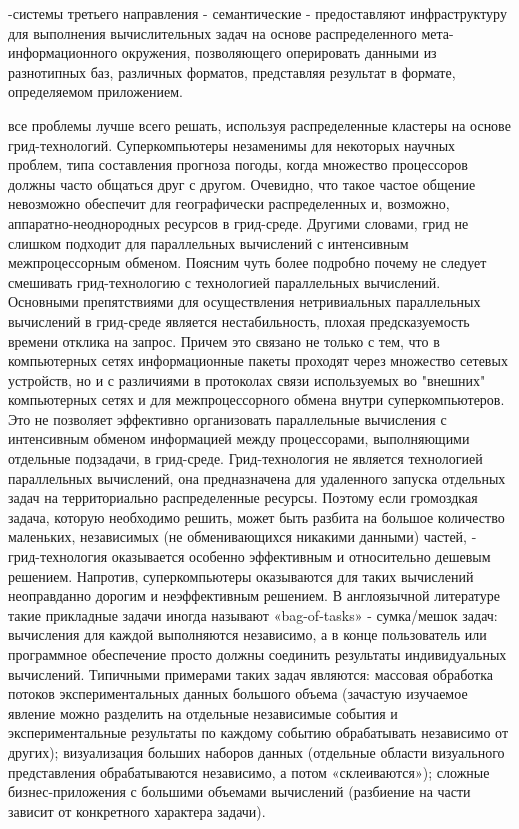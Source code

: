 \documentclass[och, referat]{SCWorks}
\begin{document}
-системы третьего направления - семантические - предоставляют инфраструктуру для выполнения вычислительных задач на основе распределенного мета-информационного окружения, позволяющего оперировать данными из разнотипных баз, различных форматов, представляя результат в формате, определяемом приложением. 
\newline

 все проблемы лучше всего решать, используя распределенные кластеры на основе грид-технологий. Суперкомпьютеры незаменимы для некоторых научных проблем, типа составления прогноза погоды, когда множество процессоров должны часто общаться друг с другом. Очевидно, что такое частое общение невозможно обеспечит для географически распределенных и, возможно, аппаратно-неоднородных ресурсов в грид-среде. Другими словами, грид не слишком подходит для параллельных вычислений с интенсивным межпроцессорным обменом. Поясним чуть более подробно почему не следует смешивать грид-технологию с технологией параллельных вычислений. Основными препятствиями для осуществления нетривиальных параллельных вычислений в грид-среде является нестабильность, плохая предсказуемость времени отклика на запрос. Причем это связано не только с тем, что в компьютерных сетях информационные пакеты проходят через множество сетевых устройств, но и с различиями в протоколах связи используемых во "внешних" компьютерных сетях и для межпроцессорного обмена внутри суперкомпьютеров. Это не позволяет эффективно организовать параллельные вычисления с интенсивным обменом информацией между процессорами, выполняющими отдельные подзадачи, в грид-среде. Грид-технология не является технологией параллельных вычислений, она предназначена для удаленного запуска отдельных задач на территориально распределенные ресурсы. Поэтому если громоздкая задача, которую необходимо решить, может быть разбита на большое количество маленьких, независимых (не обменивающихся никакими данными) частей, - грид-технология оказывается особенно эффективным и относительно дешевым решением. Напротив, суперкомпьютеры оказываются для таких вычислений неоправданно дорогим и неэффективным решением. В англоязычной литературе такие прикладные задачи иногда называют «bag-of-tasks» - сумка/мешок задач: вычисления для каждой выполняются независимо, а в конце пользователь или программное обеспечение просто должны соединить результаты индивидуальных вычислений. Типичными примерами таких задач являются:  массовая обработка потоков экспериментальных данных большого объема (зачастую изучаемое явление можно разделить на отдельные независимые события и экспериментальные результаты по каждому событию обрабатывать независимо от других);  визуализация больших наборов данных (отдельные области визуального представления обрабатываются независимо, а потом «склеиваются»);  сложные бизнес-приложения с большими объемами вычислений (разбиение на части зависит от конкретного характера задачи). 
\end{document}

